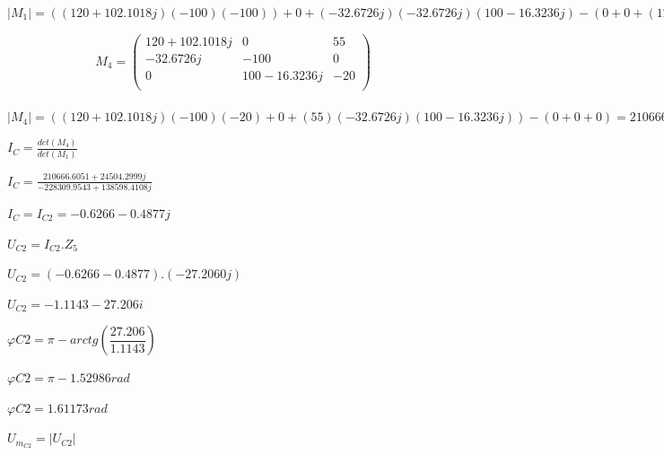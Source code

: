 \documentclass[10pt,a4paper]{article}
\begin{document}
$|M_{1}| = ((120+102.1018j)(-100)(-100))+0+(-32.6726j)(-32.6726j)(100-16.3236j)-(0+0+(120+102.1018j)(100-16.3236j)(100+5.4666j)) = -228309.9543+138598.4108j$

\vspace*{0.5cm}

\[
M_{4}=
\begin{pmatrix}
120+102.1018j & 0 & 55 \\ -32.6726j & -100 & 0 \\ 0 & 100-16.3236j & -20 \\
\end{pmatrix}
\]\\

$|M_{4}| = ((120+102.1018j)(-100)(-20)+0+(55)(-32.6726j)(100-16.3236j))-(0+0+0) = 210666.6051+24504.2999j $

\newpage

$I_{C}=\frac{det(M_{4})}{det(M_{1})}$

\vspace*{0.1cm}

$I_{C}=\frac{210666.6051+24504.2999j}{-228309.9543+138598.4108j}$

\vspace*{0.1cm}

$I_{C} = I_{C2} =  -0.6266-0.4877j$

\vspace{0.5cm}

$U_{C2}= I_{C2}.Z_{5} $

\vspace*{0.1cm}

$U_{C2}= (-0.6266-0.4877).(-27.2060j) $

\vspace*{0.1cm}

$U_{C2}= -1.1143-27.206 i $

\vspace{0.5cm}

$\varphi{C2} = \pi - arctg(\dfrac{27.206}{1.1143})$

\vspace*{0.1cm}

$\varphi{C2} =\pi - 1.52986 rad $

\vspace*{0.1cm}

$\varphi{C2} = 1.61173 rad$

\vspace*{0.5cm}

$U_{m_{C2}} = |U_{C2}|$

\vspace*{0.1cm}
\end{document}
